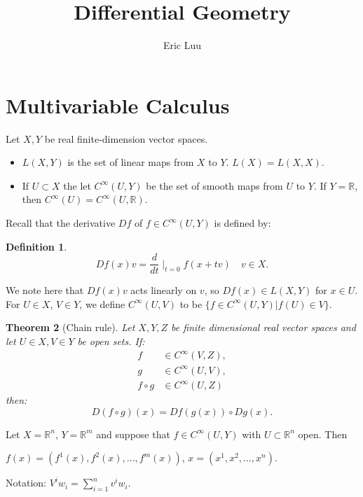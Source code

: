 \documentclass{article}
\title{Differential Geometry}
\author{Eric Luu}
\newtheorem{theorem}{Theorem}
\newtheorem{definition}[theorem]{Definition}
\theoremstyle{definition}
\numberwithin{theorem}{section}
\numberwithin{equation}{section}
\begin{document}
\maketitle

\section{Multivariable Calculus}

Let $X, Y$ be real finite-dimension vector spaces.

\begin{itemize}
	\item $L(X, Y)$ is the set of linear maps from $X$ to $Y$. $L(X) = L(X, X)$. 
	\item If $U \subset X$ the let $C^\infty(U, Y)$ be the set of smooth maps from $U$ to $Y$. If $Y = \mathbb{R}$, then $C^\infty(U) = C^\infty(U, \mathbb{R})$. 
\end{itemize}
Recall that the derivative $D f$ of $f \in C^\infty(U, Y)$ is defined by:
\begin{definition}
	\begin{equation}
		D f(x) v = \dfrac{d}{dt}\mid_{t = 0} f(x + tv) \quad v \in X.
	\end{equation}
\end{definition}
We note here that $D f(x) v$ acts linearly on $v$, so $D f(x) \in L(X, Y)$ for $x \in U$. 
For $U \in X$, $V \in Y$, we define $C^\infty(U, V)$ to be $\{ f \in C^\infty(U, Y) | f(U) \in V\}$.

\begin{theorem}[Chain rule]
	Let $X, Y, Z$ be finite dimensional real vector spaces and let $U \in X, V \in Y$ be open sets. If: 
	\begin{align*}
		f &\in C^\infty(V, Z),\\
		g &\in C^\infty(U, V),\\
		f \circ g &\in C^\infty(U, Z)
	\end{align*}
	then:
	\begin{equation}
		D(f \circ g) (x) = D f(g(x)) \circ D g(x).
	\end{equation}
\end{theorem}

Let $X = \mathbb{R}^n$, $Y = \mathbb{R}^m$ and suppose that $f \in C^\infty (U, Y)$ with $U \subset \mathbb{R}^n$ open. Then 

$f(x) = (f^1(x), f^2(x), ..., f^m(x))$, $x = (x^1, x^2, ..., x^n)$. 

Notation: $V^i w_i = \sum_{i = 1}^n v^i w_i$. 
\end{document}
